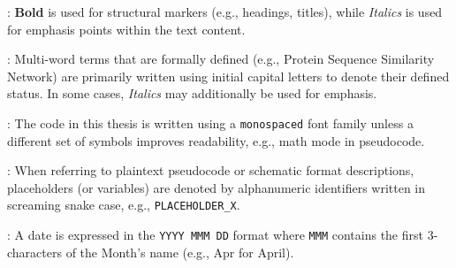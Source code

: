 \documentclass[a4paper,12pt]{extarticle}
\begin{document}
  \begin{description}[leftmargin=1.2em]
    \item[Font Style]: \textbf{Bold} is used for structural markers (e.g., headings, titles), while \textit{Italics} is used for emphasis points within the text content.
    \item[Initial Capital Letters]: Multi-word terms that are formally defined (e.g., Protein Sequence Similarity Network) are primarily written using initial capital letters to denote their defined status. In some cases, \textit{Italics} may additionally be used for emphasis.
    \item[Code]: The code in this thesis is written using a \texttt{monospaced} font family unless a different set of symbols improves readability, e.g., math mode in pseudocode.
    \item[Placeholder]: When referring to plaintext pseudocode or schematic format descriptions, placeholders (or variables) are denoted by alphanumeric identifiers written in screaming snake case, e.g., \texttt{PLACEHOLDER\_X}.
    \item[Date]: A date is expressed in the  \texttt{YYYY MMM DD} format where \texttt{MMM} contains the first 3-characters of the Month's name (e.g., Apr for April).
  \end{description}

  \cleardoublepage


  \pagestyle{restpages}

  
  \cleardoublepage
  
  \cleardoublepage
  
  \cleardoublepage
  
  \cleardoublepage
  
  \cleardoublepage
  
  \cleardoublepage
  
  \cleardoublepage


  
  
\end{document}
